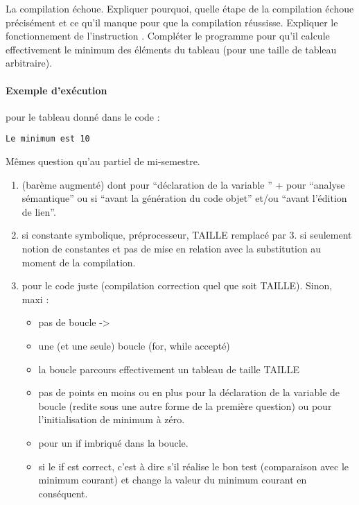 \question La compilation échoue. Expliquer pourquoi, quelle étape de la
  compilation échoue précisément et ce qu'il manque pour que la compilation réussisse. 
\question Expliquer le fonctionnement de l'instruction . 
\question Compléter le programme pour qu'il calcule effectivement le minimum
  des éléments du tableau (pour une taille de tableau arbitraire). 

\paragraph{Exemple d'exécution} pour le tableau donné dans le code :

\begin{small}
\begin{verbatim}
Le minimum est 10
\end{verbatim}
\end{small}

\begin{correction}
Mêmes question qu'au partiel de mi-semestre.
\begin{baremeenv}
  \begin{enumerate}
\item {} (barème augmenté) dont  pour ``déclaration de la variable '' +  pour ``analyse
  sémantique'' ou  si ``avant la génération du code objet'' et/ou
  ``avant l'édition de lien''.
\item {} si constante symbolique, préprocesseur,  TAILLE remplacé
  par 3.  si seulement notion de constantes et pas de mise en
  relation avec la substitution au moment de la compilation.
\item {} pour le code juste (compilation correction quel que soit
  TAILLE). Sinon, maxi  :
  \begin{itemize}
  \item pas de boucle -> 
  \item {} une (et une seule) boucle (for, while accepté)
  \item {} la boucle parcours effectivement un tableau de taille TAILLE
  \item pas de points en moins ou en plus pour la déclaration de la
    variable de boucle (redite sous une autre forme de la première
    question) ou pour l'initialisation de minimum à zéro.
\item {} pour un if imbriqué dans la boucle.
\item {} si le if est correct, c'est à dire s'il réalise le bon test (comparaison avec le minimum
  courant) et change la valeur du minimum courant en conséquent.
  \end{itemize}
\end{enumerate}
\end{baremeenv}
\end{correction}

